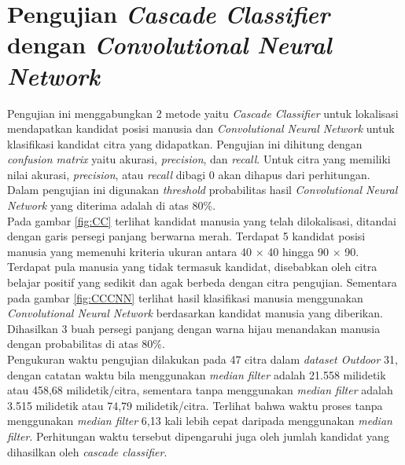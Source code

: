 \section{Pengujian \textit{Cascade Classifier} dengan \textit{Convolutional Neural Network}}
\noindent Pengujian ini menggabungkan 2 metode yaitu \textit{Cascade Classifier} untuk lokalisasi mendapatkan kandidat posisi manusia dan \textit{Convolutional Neural Network} untuk klasifikasi kandidat citra yang didapatkan. Pengujian ini dihitung dengan \textit{confusion matrix} yaitu akurasi, \textit{precision}, dan \textit{recall}. Untuk citra yang memiliki nilai akurasi, \textit{precision}, atau \textit{recall} dibagi 0 akan dihapus dari perhitungan. Dalam pengujian ini digunakan \textit{threshold} probabilitas hasil \textit{Convolutional Neural Network} yang diterima adalah di atas 80\%.\\
\noindent Pada gambar \ref{fig:CC} terlihat kandidat manusia yang telah dilokalisasi, ditandai dengan garis persegi panjang berwarna merah. Terdapat 5 kandidat posisi manusia yang memenuhi kriteria ukuran antara 40 $\times$ 40 hingga 90 $\times$ 90. Terdapat pula manusia yang tidak termasuk kandidat, disebabkan oleh citra belajar positif yang sedikit dan agak berbeda dengan citra pengujian. Sementara pada gambar \ref{fig:CCCNN} terlihat hasil klasifikasi manusia menggunakan \textit{Convolutional Neural Network} berdasarkan kandidat manusia yang diberikan. Dihasilkan 3 buah persegi panjang dengan warna hijau menandakan manusia dengan probabilitas di atas 80\%. \\
\noindent Pengukuran waktu pengujian dilakukan pada 47 citra dalam \textit{dataset Outdoor} 31, dengan catatan waktu bila menggunakan \textit{median filter} adalah 21.558 milidetik atau 458,68 milidetik/citra, sementara tanpa menggunakan \textit{median filter} adalah 3.515 milidetik atau 74,79 milidetik/citra. Terlihat bahwa waktu proses tanpa menggunakan \textit{median filter} 6,13 kali lebih cepat daripada menggunakan \textit{median filter}. Perhitungan waktu tersebut dipengaruhi juga oleh jumlah kandidat yang dihasilkan oleh \textit{cascade classifier}.

\begin{adjustbox}{width=1\textwidth}
\noindent\begin{minipage}{\linewidth}
	\label{fig:CC}
\end{minipage}
\end{adjustbox}

